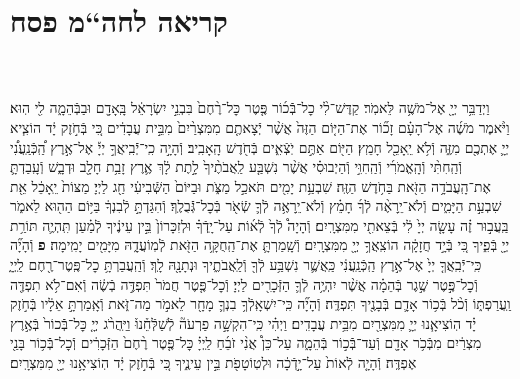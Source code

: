 \documentclass[twoside, openany, parskip=half, 11pt]{book}
\begin{document}
\begin{sometimes}
\begin{footnotesize}
\begin{multicols}{2}
\end{multicols}

\section[חה“מ פסח]{קריאה לחה“מ פסח}


\begin{multicols}{2}

\\ \\
וַיְדַבֵּ֥ר יְיָ֖ אֶל־מֹשֶׁ֥ה לֵּאמֹֽר׃ קַדֶּשׁ־לִ֨י כׇל־בְּֿֿכ֜וֹר פֶּ֤טֶר כׇּל־רֶ֨חֶם֙ בִּבְנֵ֣י יִשְׂרָאֵ֔ל בָּֽאָדָ֖ם וּבַבְּֿהֵמָ֑ה לִ֖י הֽוּא׃ וַיֹּ֨אמֶר מֹשֶׁ֜ה אֶל־הָעָ֗ם זָכ֞וֹר אֶת־הַיּ֤וֹם הַזֶּה֙ אֲשֶׁ֨ר יְֿצָאתֶ֤ם מִמִּצְרַ֨יִם֙ מִבֵּ֣ית עֲבָדִ֔ים כִּ֚י בְּֿחֹ֣זֶק יָ֔ד הוֹצִ֧יא יְיָ֛ אֶתְכֶ֖ם מִזֶּ֑ה וְֿלֹ֥א יֵֽאָכֵ֖ל חָמֵֽץ׃ הַיּ֖וֹם אַתֶּ֣ם יֹֽצְֿאִ֑ים בְּֿחֹ֖דֶשׁ הָֽאָבִֽיב׃
וְֿהָיָ֣ה כִֽי־יְֿֿבִֽיאֲךָ֣ יְיָ֡ אֶל־אֶ֣רֶץ הַֽ֠כְּֿנַֽעֲנִ֠י וְֿהַֽחִתִּ֨י וְֿהָֽאֱמֹרִ֜י וְֿהַֽחִוִּ֣י וְֿהַיְבוּסִ֗י אֲשֶׁ֨ר נִשְׁבַּ֤ע לַֽאֲבֹתֶ֨יךָ֙ לָ֣תֶת לָ֔ךְ אֶ֛רֶץ זָבַ֥ת חָלָ֖ב וּדְבָ֑שׁ וְֿעָֽבַדְתָּ֛ אֶת־הָֽעֲבֹדָ֥ה הַזֹּ֖את בַּחֹ֥דֶשׁ הַזֶּֽה׃ שִׁבְעַ֥ת יָמִ֖ים תֹּאכַ֣ל מַצֹּ֑ת וּבַיּוֹם֙ הַשְּֿׁבִיעִ֔י חַ֖ג לַיְיָ׃ מַצּוֹת֙ יֵֽאָכֵ֔ל אֵ֖ת שִׁבְעַ֣ת הַיָּמִ֑ים וְֿלֹא־יֵֽרָאֶ֨ה לְֿךָ֜ חָמֵ֗ץ וְֿלֹא־יֵֽרָאֶ֥ה לְֿךָ֛ שְֿׂאֹ֖ר בְּֿכׇל־גְּֿֿבֻלֶֽךָ׃ וְֿהִגַּדְתָּ֣ לְֿבִנְךָ֔ בַּיּ֥וֹם הַה֖וּא לֵאמֹ֑ר בַּֽעֲב֣וּר זֶ֗ה עָשָׂ֤ה יְיָ֙ לִ֔י בְּֿצֵאתִ֖י מִמִּצְרָֽיִם׃ וְֿהָיָה֩ לְֿךָ֙ לְֿא֜וֹת עַל־יָֽדְֿךָ֗ וּלְזִכָּרוֹן֙ בֵּ֣ין עֵינֶ֔יךָ לְֿמַ֗עַן תִּֽהְיֶ֛ה תּוֹרַ֥ת יְיָ֖ בְּֿפִ֑יךָ כִּ֚י בְּֿיָ֣ד חֲזָקָ֔ה הוֹצִֽאֲךָ֥ יְיָ֖ מִמִּצְרָֽיִם׃ וְֿשָֽׁמַרְתָּ֛ אֶת־הַֽחֻקָּ֥ה הַזֹּ֖את לְֿמֽוֹעֲדָ֑הּ מִיָּמִ֖ים יָמִֽימָה׃ \textbf{פ}
וְֿהָיָ֞ה כִּֽי־יְֿֿבִֽאֲךָ֤ יְיָ֙ אֶל־אֶ֣רֶץ הַֽכְּֿנַֽעֲנִ֔י כַּֽאֲשֶׁ֛ר נִשְׁבַּ֥ע לְֿךָ֖ וְֿלַֽאֲבֹתֶ֑יךָ וּנְתָנָ֖הּ לָֽךְ׃ וְֿהַֽעֲבַרְתָּ֥ כׇל־פֶּֽטֶר־רֶ֖חֶם לַֽיְיָ֑ וְֿכׇל־פֶּ֣טֶר שֶׁ֣גֶר בְּֿהֵמָ֗ה אֲשֶׁ֨ר יִהְיֶ֥ה לְֿךָ֛ הַזְּֿכָרִ֖ים לַיְיָ׃ וְֿכׇל־פֶּ֤טֶר חֲמֹר֙ תִּפְדֶּ֣ה בְֿשֶׂ֔ה וְֿאִם־לֹ֥א תִפְדֶּ֖ה וַֽעֲרַפְתּ֑וֹ וְֿכֹ֨ל בְּֿכ֥וֹר אָדָ֛ם בְּֿבָנֶ֖יךָ תִּפְדֶּֽה׃ וְֿהָיָ֞ה כִּֽי־יִשְׁאָֽלְֿךָ֥ בִנְךָ֛ מָחָ֖ר לֵאמֹ֣ר מַה־זֹּ֑את וְֿאָֽמַרְתָּ֣ אֵלָ֔יו בְּֿחֹ֣זֶק יָ֗ד הֽוֹצִיאָ֧נוּ יְיָ֛ מִמִּצְרַ֖יִם מִבֵּ֥ית עֲבָדִֽים׃ וַיְהִ֗י כִּֽי־הִקְשָׁ֣ה פַרְעֹה֘ לְֿשַׁלְּֿחֵ֒נוּ֒ וַיַּֽהֲרֹ֨ג יְיָ֤ כׇּל־בְּֿֿכוֹר֙ בְּֿאֶ֣רֶץ מִצְרַ֔יִם מִבְּֿכֹ֥ר אָדָ֖ם וְֿעַד־בְּֿֿכ֣וֹר בְּֿהֵמָ֑ה עַל־כֵּן֩ אֲנִ֨י זֹבֵ֜חַ לַֽיְיָ֗ כׇּל־פֶּ֤טֶר רֶ֨חֶם֙ הַזְּֿכָרִ֔ים וְֿכׇל־בְּֿֿכ֥וֹר בָּנַ֖י אֶפְדֶּֽה׃ וְֿהָיָ֤ה לְֿאוֹת֙ עַל־יָ֣דְֿכָ֔ה וּלְטֽוֹטָפֹ֖ת בֵּ֣ין עֵינֶ֑יךָ כִּ֚י בְּֿחֹ֣זֶק יָ֔ד הֽוֹצִיאָ֥נוּ יְיָ֖ מִמִּצְרָֽיִם׃



\end{multicols}
\end{footnotesize}
\end{sometimes}
\end{document}
